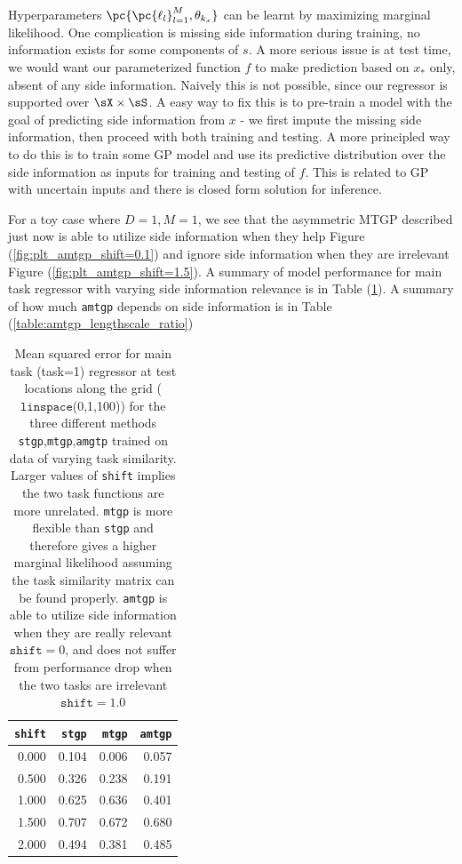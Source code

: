 \documentclass[11pt]{article}
\begin{document}
Hyperparameters $\pc{\pc{\ell_l}_{l=1}^M, \theta_{k_x}}$ can be learnt by maximizing marginal likelihood. One complication is missing side information during training, no information exists for some components of $s$. A more serious issue is at test time, we would want our parameterized function $f$ to make prediction based on $x_*$ only, absent of any side information. Naively this is not possible, since our regressor is supported over $\sX\times\sS$. A easy way to fix this is to pre-train a model with the goal of predicting side information from $x$ - we first impute the missing side information, then proceed with both training and testing. A more principled way to do this is to train some GP model and use its predictive distribution over the side information as inputs for training and testing of $f$. This is related to GP with uncertain inputs and there is closed form solution for inference. 

For a toy case where $D=1,M=1$, we see that the asymmetric MTGP described just now is able to utilize side information when they help Figure (\ref{fig:plt_amtgp_shift=0.1}) and ignore side information when they are irrelevant Figure (\ref{fig:plt_amtgp_shift=1.5}). A summary of model performance for main task regressor with varying side information relevance is in Table (\ref{table:amtgp_mse_wrt_shift}). A summary of how much \texttt{amtgp} depends on side information is in Table (\ref{table:amtgp_lengthscale_ratio})

\begin{table}[h!]
\begin{center}
    \begin{tabular}{r|rrr}
        \texttt{shift} &  \texttt{stgp} &   \texttt{mtgp} &   \texttt{amtgp} \\
    \hline
        0.000 &  0.104 &  0.006 &   0.057 \\
        0.500 &  0.326 &  0.238 &   0.191 \\
        1.000 &  0.625 &  0.636 &   0.401 \\
        1.500 &  0.707 &  0.672 &   0.680 \\
        2.000 &  0.494 &  0.381 &   0.485 \\
    \end{tabular}
    \caption{Mean squared error for main task (task=1) regressor at test locations along the grid ($\texttt{linspace}$(0,1,100)) for the three different methods \texttt{stgp},\texttt{mtgp},\texttt{amgtp} trained on data of varying task similarity. Larger values of \texttt{shift} implies the two task functions are more unrelated. \texttt{mtgp} is more flexible than \texttt{stgp} and therefore gives a higher marginal likelihood assuming the task similarity matrix can be found properly. \texttt{amtgp} is able to utilize side information when they are really relevant $\texttt{shift}=0$, and does not suffer from performance drop when the two tasks are irrelevant $\texttt{shift}=1.0$ }
    \label{table:amtgp_mse_wrt_shift}
\end{center}
\end{table}
\end{document}
